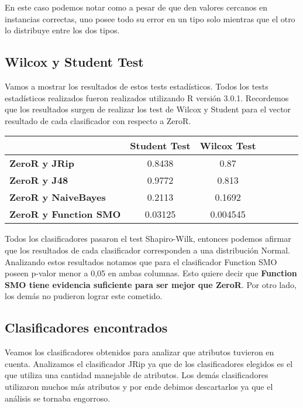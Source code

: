 En este caso podemos notar como a pesar de que den valores cercanos en instancias correctas, uno posee todo su error en un tipo solo mientras que el otro lo distribuye entre los dos tipos.

\subsection{Wilcox y Student Test}

Vamos a mostrar los resultados de estos tests estadísticos. Todos los tests estadísticos realizados fueron realizados utilizando R versión 3.0.1. Recordemos que los resultados surgen de realizar los test de Wilcox y Student para el vector resultado de cada clasificador con respecto a ZeroR.

\begin{table}[H]
\centering
\begin{tabular}{|l|c|c|c|c|c|c|}
\hline
\textbf{}  & \textbf{Student Test} & \textbf{Wilcox Test} \\ \hline
\textbf{ZeroR y JRip}  & 0.8438 & 0.87 \\ \hline
\textbf{ZeroR y J48}  & 0.9772 & 0.813 \\ \hline
\textbf{ZeroR y NaiveBayes}  & 0.2113 & 0.1692 \\ \hline
\textbf{ZeroR y Function SMO}  & 0.03125 & 0.004545 \\ \hline
\end{tabular}
\end{table}

Todos los clasificadores pasaron el test Shapiro-Wilk, entonces podemos afirmar que los resultados de cada clasificador corresponden a una distribución Normal. Analizando estos resultados notamos que para el clasificador Function SMO poseen p-valor menor a 0,05 en ambas columnas. Esto quiere decir que \textbf{Function SMO tiene evidencia suficiente para ser mejor que ZeroR}. Por otro lado, los demás no pudieron lograr este cometido. 

\subsection{Clasificadores encontrados}

Veamos los clasificadores obtenidos para analizar que atributos tuvieron en cuenta. Analizamos el clasificador JRip ya que de los clasificadores elegidos es el que utiliza una cantidad manejable de atributos. Los demás clasificadores utilizaron muchos más atributos y por ende debimos descartarlos ya que el análisis se tornaba engorroso. 

